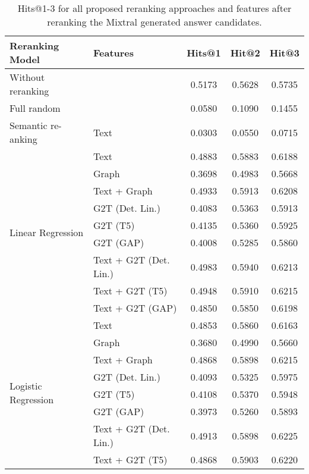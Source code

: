 \begin{table}[htbp]
    \setlength{\tabcolsep}{3pt}
    \caption{Hits@1-3 for all proposed reranking approaches and features after reranking the Mixtral generated answer candidates.}
    \label{tab:controllable_fusion:mixtral_all_results}
    \fontsize{9pt}{11pt}\selectfont
    \centering
    \begin{tabular}{l p{5cm} c c c}
        \toprule
        \textbf{Reranking Model} & \textbf{Features} & \textbf{Hits@1} & \textbf{Hit@2} & \textbf{Hit@3} \\
        \midrule
        Without reranking & & 0.5173 & 0.5628 & 0.5735 \\
        \cmidrule(lr){1-5}
        Full random & & 0.0580 & 0.1090 & 0.1455 \\
        \cmidrule(lr){1-5}
        Semantic re-anking & Text & 0.0303 & 0.0550 & 0.0715 \\
        \cmidrule(lr){1-5}
        \multirow{9}{*}{Linear Regression} & Text & 0.4883 & 0.5883 & 0.6188 \\
        & Graph & 0.3698 & 0.4983 & 0.5668 \\
        & Text + Graph & 0.4933 & 0.5913 & 0.6208 \\
        & G2T (Det. Lin.) & 0.4083 & 0.5363 & 0.5913 \\
        & G2T (T5) & 0.4135 & 0.5360 & 0.5925 \\
        & G2T (GAP) & 0.4008 & 0.5285 & 0.5860 \\
        & Text + G2T (Det. Lin.) & 0.4983 & 0.5940 & 0.6213 \\
        & Text + G2T (T5) & 0.4948 & 0.5910 & 0.6215 \\
        & Text + G2T (GAP) & 0.4850 & 0.5850 & 0.6198 \\
        \midrule
        \multirow{12}{*}{Logistic Regression} & Text & 0.4853 & 0.5860 & 0.6163 \\
        & Graph & 0.3680 & 0.4990 & 0.5660 \\
        & Text + Graph & 0.4868 & 0.5898 & 0.6215 \\
        & G2T (Det. Lin.) & 0.4093 & 0.5325 & 0.5975 \\
        & G2T (T5) & 0.4108 & 0.5370 & 0.5948 \\
        & G2T (GAP) & 0.3973 & 0.5260 & 0.5893 \\
        & Text + G2T (Det. Lin.) & 0.4913 & 0.5898 & 0.6225 \\
        & Text + G2T (T5) & 0.4868 & 0.5903 & 0.6220 \\

\end{tabular}
\end{table}
